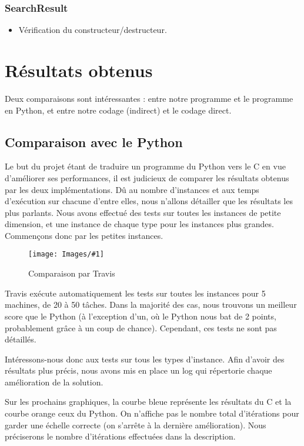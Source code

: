 \documentclass[hideweeklyreports]{polytech/polytech}
\newcommand{\img}[3]{%
	\begin{figure}[H]
		\centering
   		\texttt{[image: Images/\#1]}
  	 	\caption{#2}
	\end{figure}
}
\begin{document}
			\subsection{SearchResult}
				\begin{itemize}
					\item Vérification du constructeur/destructeur.
				\end{itemize}
		
	\chapter{Résultats obtenus}
		Deux comparaisons sont intéressantes : entre notre programme et le programme en Python, et entre notre codage (indirect) et le codage direct.
		
		\section{Comparaison avec le Python} %
			Le but du projet étant de traduire un programme du Python vers le C en vue d'améliorer ses performances, il est judicieux de comparer les résultats obtenus par les deux implémentations. Dû au nombre d'instances et aux temps d'exécution sur chacune d'entre elles, nous n'allons détailler que les résultats les plus parlants. Nous avons effectué des tests sur toutes les instances de petite dimension, et une instance de chaque type pour les instances plus grandes. Commençons donc par les petites instances.
			
			\img{TravisCompare.png}{Comparaison par Travis}{0.575}
			
			Travis exécute automatiquement les tests sur toutes les instances pour 5 machines, de 20 à 50 tâches. Dans la majorité des cas, nous trouvons un meilleur score que le Python (à l'exception d'un, où le Python nous bat de 2 points, probablement grâce à un coup de chance). Cependant, ces tests ne sont pas détaillés.
			
			Intéressons-nous donc aux tests sur tous les types d'instance. Afin d'avoir des résultats plus précis, nous avons mis en place un log qui répertorie chaque amélioration de la solution.
			
			Sur les prochains graphiques, la courbe bleue représente les résultats du C et la courbe orange ceux du Python. On n'affiche pas le nombre total d'itérations pour garder une échelle correcte (on s'arrête à la dernière amélioration). Nous préciserons le nombre d'itérations effectuées dans la description.
			
\end{document}
